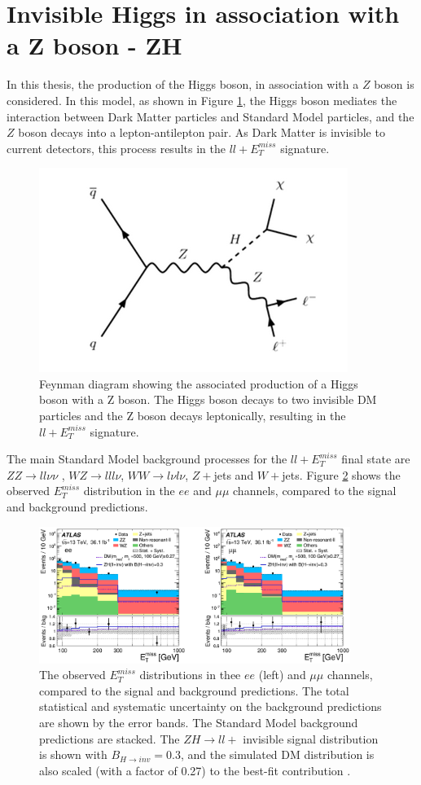 \documentclass[11pt,a4paper,openright,twoside]{report}
\newcommand{\ZZ}{$ZZ\to ll\nu\nu$ }
\newcommand{\met}{$E_T^{miss}$ }
\begin{document}
\section{Invisible Higgs in association with a Z boson - ZH}
In this thesis, the production of the Higgs boson, in association with a $Z$ boson is considered. In this model, as shown in Figure \ref{fig:HZ}, the Higgs boson mediates the interaction between Dark Matter particles and Standard Model particles, and the $Z$ boson decays into a lepton-antilepton pair. As Dark Matter is invisible to current detectors, this process results in the $ll+$\met signature.
\begin{figure}[H]
\centering
	\includegraphics[width=0.5\linewidth]{HZ.png}
	\caption{Feynman diagram showing the associated production of a Higgs boson with a Z boson. The Higgs boson decays to two invisible DM particles and the Z boson decays leptonically, resulting in the $ll+ E_T^{miss}$ signature.}
		\label{fig:HZ}
\end{figure}
The main Standard Model background processes for the $ll+$\met final state are \ZZ, $WZ\to lll\nu$, $WW\to l\nu l\nu$, $Z+$jets and $W+$jets. Figure \ref{fig:ZH_results} shows the observed \met distribution in the $ee$ and $\mu\mu$ channels, compared to the signal and background predictions.
\begin{figure}[H]
\centering
		\includegraphics[width=0.9\textwidth]{ZH_results.png}
		\caption{The observed \met distributions in thee $ee$ (left) and $\mu\mu$ channels, compared to the signal and background predictions. The total statistical and systematic uncertainty on the background predictions are shown by the error bands. The Standard Model background predictions are stacked. The $ZH\to ll+$ invisible signal distribution is shown with $B_{H\to inv}=0.3$, and the simulated DM distribution is also scaled (with a factor of 0.27) to the best-fit contribution \cite{ZH_ATLAS}.}
		\label{fig:ZH_results}
\end{figure}
\end{document}

